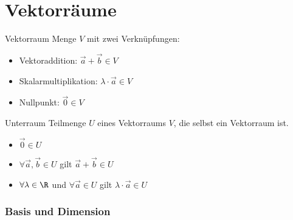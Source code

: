 \graphicspath{{images/}}

\section{Vektorräume}

\begin{definition}{Vektorraum}
    Menge $V$ mit zwei Verknüpfungen:
    \begin{itemize}
        \item Vektoraddition: $\overrightarrow{a} + \overrightarrow{b} \in V$
        \item Skalarmultiplikation: $\lambda \cdot \overrightarrow{a} \in V$
        \item Nullpunkt: $\overrightarrow{0} \in V$
    \end{itemize}
\end{definition}

\begin{definition}{Unterraum}
    Teilmenge $U$ eines Vektorraums $V$, die selbst ein Vektorraum ist.
    \begin{itemize}
        \item $\overrightarrow{0} \in U$
        \item $\forall \vec{a}, \vec{b} \in U$ gilt $\overrightarrow{a} + \overrightarrow{b} \in U$
        \item $\forall \lambda \in \R$ und $\forall \vec{a} \in U$ gilt $\lambda \cdot \overrightarrow{a} \in U$
    \end{itemize}
    
\end{definition}

\subsubsection*{Basis und Dimension}

